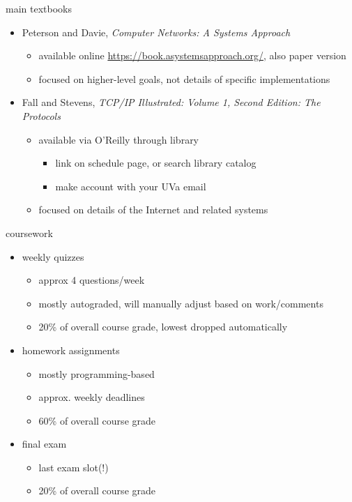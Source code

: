 
\begin{frame}{main textbooks}
    \begin{itemize}
    \item Peterson and Davie, \textit{Computer Networks:  A Systems Approach}
        \begin{itemize}
        \item available online \url{https://book.asystemsapproach.org/}, also paper version
        \item focused on higher-level goals, not details of specific implementations
        \end{itemize}
    \item Fall and Stevens, \textit{TCP/IP Illustrated: Volume 1, Second Edition: The Protocols}
        \begin{itemize}
        \item available via O'Reilly through library
            \begin{itemize}
            \item link on schedule page, or search library catalog
            \item make account with your UVa email
            \end{itemize}
        \item focused on details of the Internet and related systems
        \end{itemize}
    \end{itemize}
\end{frame}

\begin{frame}{coursework}
    \begin{itemize}
    \item weekly quizzes
        \begin{itemize}
        \item approx 4 questions/week
        \item mostly autograded, will manually adjust based on work/comments
        \item 20\% of overall course grade, lowest dropped automatically
        \end{itemize}
    \item homework assignments
        \begin{itemize}
        \item mostly programming-based
        \item approx. weekly deadlines
        \item 60\% of overall course grade
        \end{itemize}
    \item final exam
        \begin{itemize}
        \item last exam slot(!)
        \item 20\% of overall course grade
        \end{itemize}
    \end{itemize}
\end{frame}

